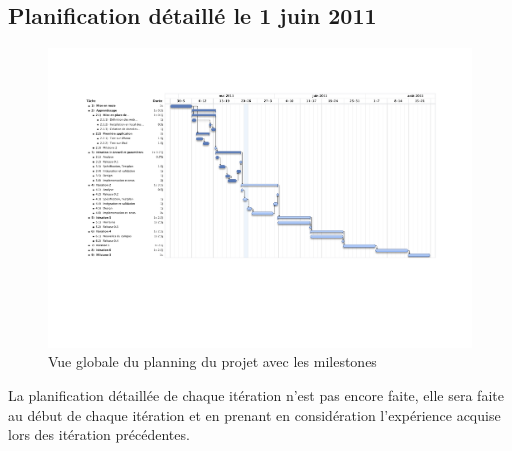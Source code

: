 	 \begin{landscape}
	 	 \subsection{Planification détaillé le 1 juin 2011}
		 \begin{figure}[H]
			 \begin{center}	
				 \includegraphics[height=0.8\textwidth]{../comon/figures/planningV2.pdf}
				 \end{center}			
				 \caption{Vue globale du planning du projet avec les milestones}			
				 \label{planV1}			
		 \end{figure}	
	 \end{landscape}
	 La planification détaillée de chaque itération n'est pas encore faite, elle sera faite au début de chaque itération et en prenant en considération l'expérience acquise lors des itération précédentes. 
